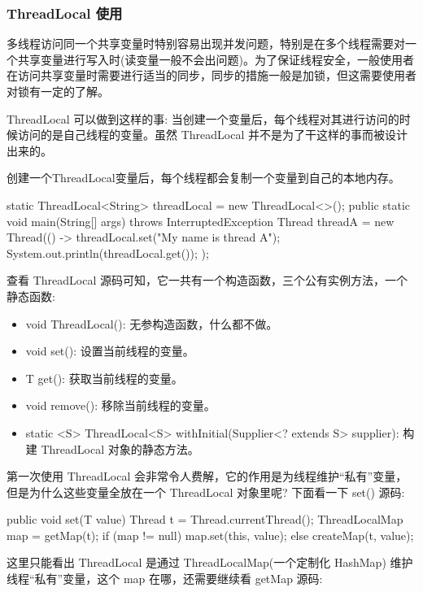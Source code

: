 \subsubsection{ThreadLocal 使用}

多线程访问同一个共享变量时特别容易出现并发问题，特别是在多个线程需要对一个共享变量进行写入时(读变量一般不会出问题)。为了保证线程安全，一般使用者在访问共享变量时需要进行适当的同步，同步的措施一般是加锁，但这需要使用者对锁有一定的了解。

ThreadLocal 可以做到这样的事: 当创建一个变量后，每个线程对其进行访问的时候访问的是自己线程的变量。虽然 ThreadLocal 并不是为了干这样的事而被设计出来的。

创建一个ThreadLocal变量后，每个线程都会复制一个变量到自己的本地内存。

\begin{Java}
static ThreadLocal<String> threadLocal = new ThreadLocal<>();
public static void main(String[] args) throws InterruptedException {
    Thread threadA = new Thread(() -> {
        threadLocal.set("My name is thread A");
        System.out.println(threadLocal.get());
    });
}
\end{Java}

查看 ThreadLocal 源码可知，它一共有一个构造函数，三个公有实例方法，一个静态函数:

\begin{itemize}
    \item void ThreadLocal(): 无参构造函数，什么都不做。
    \item void set(): 设置当前线程的变量。
    \item T get(): 获取当前线程的变量。
    \item void remove(): 移除当前线程的变量。
    \item static <S> ThreadLocal<S> withInitial(Supplier<? extends S> supplier): 构建 ThreadLocal 对象的静态方法。
\end{itemize}

第一次使用 ThreadLocal 会非常令人费解，它的作用是为线程维护``私有''变量，但是为什么这些变量全放在一个 ThreadLocal 对象里呢? 下面看一下 set() 源码:

\begin{Java}
public void set(T value) {
    Thread t = Thread.currentThread();
    ThreadLocalMap map = getMap(t);
    if (map != null) {
        map.set(this, value);
    } else {
        createMap(t, value);
    }
}
\end{Java}

这里只能看出 ThreadLocal 是通过 ThreadLocalMap(一个定制化 HashMap) 维护线程``私有''变量，这个 map 在哪，还需要继续看 getMap 源码:

